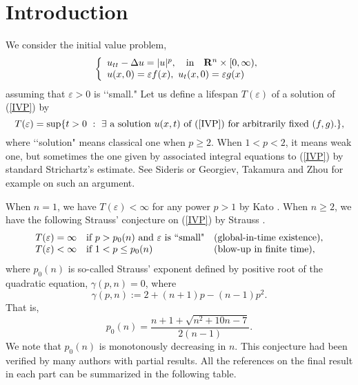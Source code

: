 \documentclass[a4paper,12pt]{article}
\numberwithin{equation}{section}
\def\R{{\bf R}}
\def\e{{\varepsilon}}
\begin{document}
\section{Introduction}
\par
We consider the initial value problem,
\begin{equation}
\label{IVP}
\left\{
\begin{array}{l}
u_{tt}-\Delta u=|u|^p,\quad \mbox{in}\quad \R^n\times[0,\infty),\\
u(x,0)=\e f(x),\ u_t(x,0)=\e g(x)
\end{array}
\right.
\end{equation}
assuming that $\e>0$ is \lq\lq small."
Let us define a lifespan $T(\e)$ of a solution of (\ref{IVP}) by
\[
T(\e)=\sup\{t>0\ :\ \exists\ \mbox{a solution $u(x,t)$ of (\ref{IVP})
for arbitrarily fixed $(f,g)$.}\},
\]
where \lq\lq solution" means classical one when $p\ge2$.
When $1<p<2$, it means weak one, but sometimes the one
given by associated integral equations to (\ref{IVP})
by standard Strichartz's estimate.
See Sideris \cite{Si84} or Georgiev, Takamura and Zhou \cite{GTZ06} for example on such an argument. 
\par
When $n=1$, we have $T(\e)<\infty$ for any power $p>1$ by Kato \cite{Kato80}.
When $n\ge2$, we have the following Strauss' conjecture on (\ref{IVP})
by Strauss \cite{St81}. 
\[
\begin{array}{lll}
T(\e)=\infty & \mbox{if $p>p_0(n)$ and $\e$ is \lq\lq small"}
& \mbox{(global-in-time existence)},\\
T(\e)<\infty & \mbox{if $1<p\le p_0(n)$}
& \mbox{(blow-up in finite time)},
\end{array}
\]
where $p_0(n)$ is so-called Strauss' exponent defined
by positive root of the quadratic equation, $\gamma(p,n)=0$, where
\begin{equation}
\label{gamma}
\gamma(p,n):=2+(n+1)p-(n-1)p^2.
\end{equation}
That is,
\begin{equation}
\label{p_0(n)}
p_0(n)=\frac{n+1+\sqrt{n^2+10n-7}}{2(n-1)}. 
\end{equation}
We note that $p_0(n)$ is monotonously decreasing in $n$.
This conjecture had been verified by many authors with partial results.
All the references on the final result in each part
can be summarized in the following table.
\end{document}
